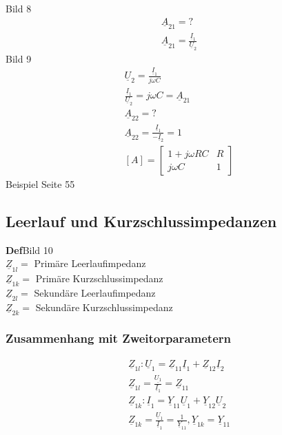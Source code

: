 Bild 8\\
\begin{align}
	\underline{A}_{21}=?\nonumber\\
	\underline{A}_{21}=\frac{\underline{I}_1}{\underline{U}_2}\nonumber
\end{align}
Bild 9
\begin{align}
	\underline{U}_2=\frac{\underline{I}_1}{j\omega C}\nonumber\\
	\frac{\underline{I}_1}{\underline{U}_2}=j\omega C =
	\underline{A}_{21}\nonumber\\
	\underline{A}_{22}=?\nonumber\\
	\underline{A}_{22}=\frac{\underline{I}_1}{-\underline{I}_2}=1\nonumber\\
	[A]=
	\begin{bmatrix}
		1+j\omega RC & R\\
		j\omega C & 1
	\end{bmatrix}\nonumber
\end{align}
Beispiel Seite 55\\
\subsection{Leerlauf und Kurzschlussimpedanzen}
\textbf{Def}Bild 10\\
$\underline{Z}_{1l}=$ Primäre Leerlaufimpedanz\\
$\underline{Z}_{1k}=$ Primäre Kurzschlussimpedanz\\
$\underline{Z}_{2l}=$ Sekundäre Leerlaufimpedanz\\
$\underline{Z}_{2k}=$ Sekundäre Kurzschlussimpedanz\\
\subsubsection{Zusammenhang mit Zweitorparametern}
\begin{align}
	\underline{Z}_{1l}:
	\underline{U}_1=\underline{Z}_11\underline{I}_1+\underline{Z}_{12}\underline{I}_2\nonumber\\
	\underline{Z}_{1l}=\frac{\underline{U_1}}{\underline{I}_1}=\underline{Z}_{11}\nonumber\\
	\underline{Z}_{1k}:
	\underline{I}_1=\underline{Y}_{11}\underline{U}_1+\underline{Y}_{12}\underline{U}_2\nonumber\\
	\underline{Z}_{1k}=\frac{\underline{U}_1}{\underline{I}_1}=\frac{1}{\underline{Y}_{11}},
	\underline{Y}_{1k}=\underline{Y}_{11}\nonumber
\end{align}
